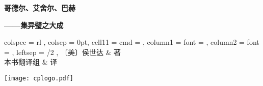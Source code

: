 
\cleardoublepage

\vspace*{3\baselineskip}

\begingroup
\centering

{\huge\bfseries 哥德尔、艾舍尔、巴赫}

\vspace{2\baselineskip}

\hfill{\Large\bfseries\sffamily ——集异璧之大成\qquad\null}

\vspace{3\baselineskip}

\begin{tabu*}{
  colspec    = rl ,
  colsep     = 0pt,
  cell{1}{1} = { cmd  = \authorbox } ,
  column{1}  = { font = \kaishu } ,
  column{2}  = { font = \small, leftsep = \ccwd/2 } ,
}
〔美〕侯世达 & 著 \\
本书翻译组  & 译 \\
\end{tabu*}

\vfill

\texttt{[image: cplogo.pdf]}

\endgroup
